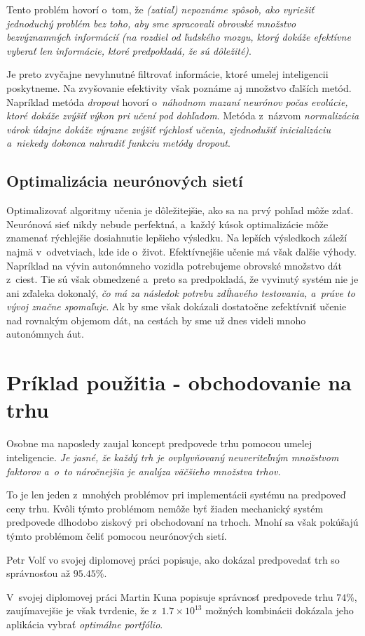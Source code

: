 \documentclass[a4paper, 11pt]{article}
\begin{document}
  Tento problém hovorí o~tom, že \emph{(zatiaľ) nepoznáme spôsob, ako vyriešiť 
  jednoduchý problém bez toho, aby sme spracovali obrovské množstvo 
  bezvýznamných informácií (na rozdiel od ľudského mozgu, ktorý dokáže 
  efektívne vyberať len informácie, ktoré predpokladá, že sú dôležité)}. 

  Je preto zvyčajne nevyhnutné filtrovať informácie, ktoré umelej inteligencii
  poskytneme. Na zvyšovanie efektivity však poznáme aj množstvo ďalších metód. 
  Napríklad metóda \emph{dropout} hovorí o~\emph{náhodnom mazaní neurónov 
  počas evolúcie, ktoré dokáže zvýšiť výkon pri učení pod dohľadom}. 
  \cite{Srivastava:2014:Dropout} 
  Metóda z~názvom \emph{normalizácia várok údajne dokáže výrazne zvýšiť 
  rýchlosť učenia, zjednodušiť inicializáciu a~niekedy dokonca nahradiť 
  funkciu metódy dropout}. \cite{Ioffe:2015:BatchNormalization}

  \subsection{Optimalizácia neurónových sietí}
  Optimalizovať algoritmy učenia je dôležitejšie, ako sa na prvý pohľad môže 
  zdať. Neurónová sieť nikdy nebude perfektná, a~každý kúsok optimalizácie
  môže znamenať rýchlejšie dosiahnutie lepšieho výsledku. Na lepších výsledkoch
  záleží najmä v~odvetviach, kde ide o~život. Efektívnejšie učenie má však 
  ďalšie výhody. Napríklad na vývin autonómneho vozidla potrebujeme obrovské 
  množstvo dát z~ciest. Tie sú však obmedzené a~preto sa predpokladá, že 
  vyvinutý systém nie je ani zďaleka dokonalý, \emph{čo má za následok potrebu 
  zdĺhavého testovania, a~práve to vývoj značne spomaľuje}.
  \cite{Tinakova:2020:AutonomneVozidla}
  Ak by sme však dokázali dostatočne zefektívniť učenie nad rovnakým objemom 
  dát, na cestách by sme už dnes videli mnoho autonómnych áut.

  \section{Príklad použitia - obchodovanie na trhu}
  Osobne ma naposledy zaujal koncept predpovede trhu pomocou umelej 
  inteligencie. \emph{Je jasné, že každý trh je ovplyvňovaný neuveriteľným 
  množstvom faktorov a~o~to náročnejšia je analýza väčšieho množstva 
  trhov.}\cite{WU:2017:PerformanceComparison} 

  To je len jeden z~mnohých problémov pri implementácii systému na predpoveď 
  ceny trhu. Kvôli týmto problémom nemôže byť žiaden mechanický systém 
  predpovede dlhodobo ziskový pri obchodovaní na trhoch. 
  Mnohí sa však pokúšajú týmto problémom čeliť pomocou neurónových sietí.

  Petr Volf vo svojej diplomovej práci popisuje, ako dokázal predpovedať trh
  so správnosťou až $95.45\%$.
  \cite{VOLF:2015:VyuzitiNaKomoditnich}

  V~svojej diplomovej práci Martin Kuna popisuje správnosť predpovede trhu
  $74\%$, zaujímavejšie je však tvrdenie, že z~$1.7\times10^{13}$ 
  možných kombinácii dokázala jeho aplikácia vybrať \emph{optimálne portfólio}.
  \cite{Kuna:2010:VyuzitiNaKapitalovych}

  
  
\end{document}
